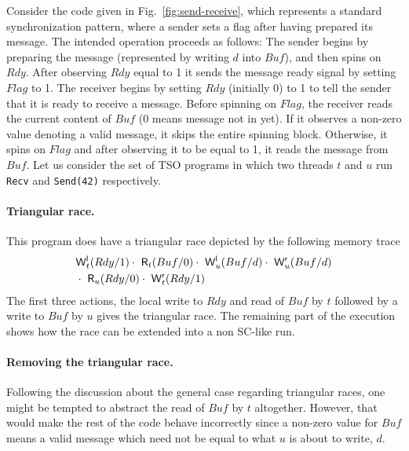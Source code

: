 Consider the code given in Fig.~\ref{fig:send-receive}, which represents a standard synchronization pattern, where a sender sets a flag after having prepared its message.
The intended operation proceeds as follows:
The sender begins by preparing the message (represented by writing $d$ into $Buf$), and then spins on $Rdy$.
After observing $Rdy$ equal to 1 it sends the message ready signal by setting $Flag$ to 1.
The receiver begins by setting $Rdy$ (initially 0) to 1 to tell the sender that it is ready to receive a message.
Before spinning on $Flag$, the receiver reads the current content of $Buf$ (0 means message not in yet).
If it observes a non-zero value denoting a valid message, it skips the entire spinning block.
Otherwise, it spins on $Flag$ and after observing it to be equal to 1, it reads the message from $Buf$.
Let us consider the set of TSO programs in which two threads $t$ and $u$ run {\tt Recv} and {\tt Send(42)} respectively.

\paragraph{Triangular race.}
This program does have a triangular race depicted by the following memory trace
\begin{eqnarray*}
& \mathsf{W}^{\mathsf{l}}_{t}(Rdy/1) \cdot\ \mathsf{R}_{t}(Buf/0)\cdot\ \mathsf{W}^{\mathsf{l}}_{u}(Buf/d) \cdot\ \mathsf{W}^{\mathsf{r}}_{u}(Buf/d)\\
&\cdot\ \mathsf{R}_{u}(Rdy/0)\cdot\ \mathsf{W}^{\mathsf{r}}_{t}(Rdy/1)
\end{eqnarray*}
The first three actions, the local write to $Rdy$ and read of $Buf$ by $t$ followed by a write to $Buf$ by $u$ gives the triangular race.
The remaining part of the execution shows how the race can be extended into a non SC-like run. 

\paragraph{Removing the triangular race.}
Following the discussion about the general case regarding triangular races, one might be tempted to abstract the read of $Buf$ by $t$ altogether.
However, that would make the rest of the code behave incorrectly since a non-zero value for $Buf$ means a valid message which need not be equal to what $u$ is about to write, $d$.

